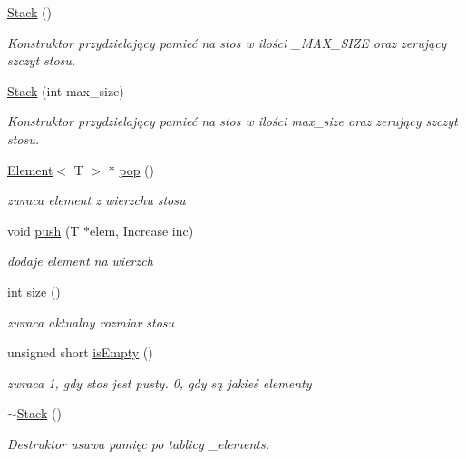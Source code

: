 \begin{DoxyCompactItemize}
\item 
\hypertarget{class_array_implementation_1_1_stack_af8a18d276411683337c92cc561a0b818}{\hyperlink{class_array_implementation_1_1_stack_af8a18d276411683337c92cc561a0b818}{Stack} ()}\label{class_array_implementation_1_1_stack_af8a18d276411683337c92cc561a0b818}

\begin{DoxyCompactList}\small\item\em Konstruktor przydzielający pamieć na stos w ilości \-\_\-\-M\-A\-X\-\_\-\-S\-I\-Z\-E oraz zerujący szczyt stosu. \end{DoxyCompactList}\item 
\hyperlink{class_array_implementation_1_1_stack_a318a54555d60ce71f4a1481c0abe6767}{Stack} (int max\-\_\-size)
\begin{DoxyCompactList}\small\item\em Konstruktor przydzielający pamieć na stos w ilości max\-\_\-size oraz zerujący szczyt stosu. \end{DoxyCompactList}\item 
\hyperlink{class_element}{Element}$<$ T $>$ $\ast$ \hyperlink{class_array_implementation_1_1_stack_a13433ea82af39913646356c9265ee8b5}{pop} ()
\begin{DoxyCompactList}\small\item\em zwraca element z wierzchu stosu \end{DoxyCompactList}\item 
void \hyperlink{class_array_implementation_1_1_stack_a0226b9697a5cf1582e922813c7100699}{push} (T $\ast$elem, Increase inc)
\begin{DoxyCompactList}\small\item\em dodaje element na wierzch \end{DoxyCompactList}\item 
int \hyperlink{class_array_implementation_1_1_stack_ad02bd7dad167700e9e8f24df91579630}{size} ()
\begin{DoxyCompactList}\small\item\em zwraca aktualny rozmiar stosu \end{DoxyCompactList}\item 
unsigned short \hyperlink{class_array_implementation_1_1_stack_aab8f329327f5623bef88ea9c3e6860a8}{is\-Empty} ()
\begin{DoxyCompactList}\small\item\em zwraca 1, gdy stos jest pusty. 0, gdy są jakieś elementy \end{DoxyCompactList}\item 
\hypertarget{class_array_implementation_1_1_stack_a6cb79dad45750b1568541655f573504e}{\hyperlink{class_array_implementation_1_1_stack_a6cb79dad45750b1568541655f573504e}{$\sim$\-Stack} ()}\label{class_array_implementation_1_1_stack_a6cb79dad45750b1568541655f573504e}

\begin{DoxyCompactList}\small\item\em Destruktor usuwa pamięc po tablicy \-\_\-elements. \end{DoxyCompactList}\end{DoxyCompactItemize}



